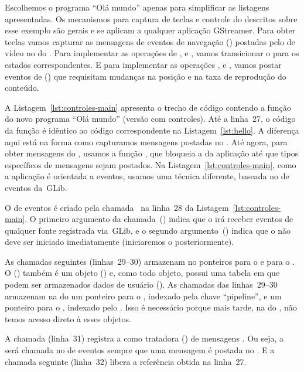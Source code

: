 \documentclass{SBCbookchapter}
\begin{document}
Escolhemos o programa ``Olá mundo'' apenas para simplificar as listagens
apresentadas.  Os mecanismos para captura de teclas e controle do
 descritos sobre esse exemplo são gerais e se aplicam a
qualquer aplicação GStreamer.  Para obter teclas vamos capturar as mensagens
de eventos de navegação () postadas pelo
 de vídeo no  do .  Para implementar as
operações de ,  e , vamos transicionar o
 para os estados correspondentes.  E para implementar as
operações ,  e , vamos postar eventos de
 () que requisitam mudanças na posição e na taxa
de reprodução do conteúdo.

A Listagem~\ref{lst:controles-main} apresenta o trecho de código contendo a
função  do novo programa ``Olá mundo'' (versão com controles).  Até
a linha~27, o código da função é idêntico ao código correspondente na
Listagem~\ref{lst:hello}.  A diferença aqui está na forma como capturamos
mensagens postadas no .  Até agora, para obter mensagens do
, usamos a função , que bloqueia a
 da aplicação até que tipos específicos de mensagens sejam
postados.  Na Listagem~\ref{lst:controles-main}, como a aplicação é
orientada a eventos, usamos uma técnica diferente, baseada no  de
eventos da~GLib.

O  de eventos é criado pela chamada~ na linha~28
da Listagem~\ref{lst:controles-main}.  O primeiro argumento da
chamada~() indica que o  irá receber eventos de qualquer
fonte registrada via~GLib, e o segundo argumento~() indica que o
 não deve ser iniciado imediatamente (iniciaremos o 
posteriormente).

As chamadas  seguintes (linhas~29--30) armazenam no
 ponteiros para o  e para o .  O 
() também é um objeto () e, como todo objeto, possui
uma tabela  em que podem ser armazenados dados de usuário
().  As chamadas das linhas~29--30 armazenam na  do
 um ponteiro para o , indexado pela chave ``pipeline'',
e um ponteiro para o , indexado pelo .  Isso é necessário
porque mais tarde, na  do , não temos acesso direto à
esses objetos.

A chamada  (linha~31) registra a 
 como tratadora () de mensagens .  Ou seja, a
 será chamada no  de eventos sempre que uma mensagem é
postada no .  E a chamada seguinte (linha~32) libera a referência
obtida na linha~27.
\end{document}
